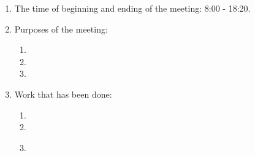 \begin{enumerate}
	
	\item The time of beginning and ending of the meeting: 8:00 - 18:20.
	
	\item Purposes of the meeting: 
	\begin{enumerate}
		
		\item 
		
		\item 
		
        \item 
		
	\end{enumerate}

	\item Work that has been done:
	\begin{enumerate}
		
		\item 
		
		\item 
		
        \item 
		
        \begin{figure}[H]
	  	  \begin{minipage}[h]{0.2\linewidth}
	  	    \center  
	  	  \end{minipage}
	  	  \begin{minipage}[h]{0.6\linewidth}
	  		\caption{}
	  	  \end{minipage}
	   \end{figure}

	\end{enumerate}
	

\end{enumerate}
